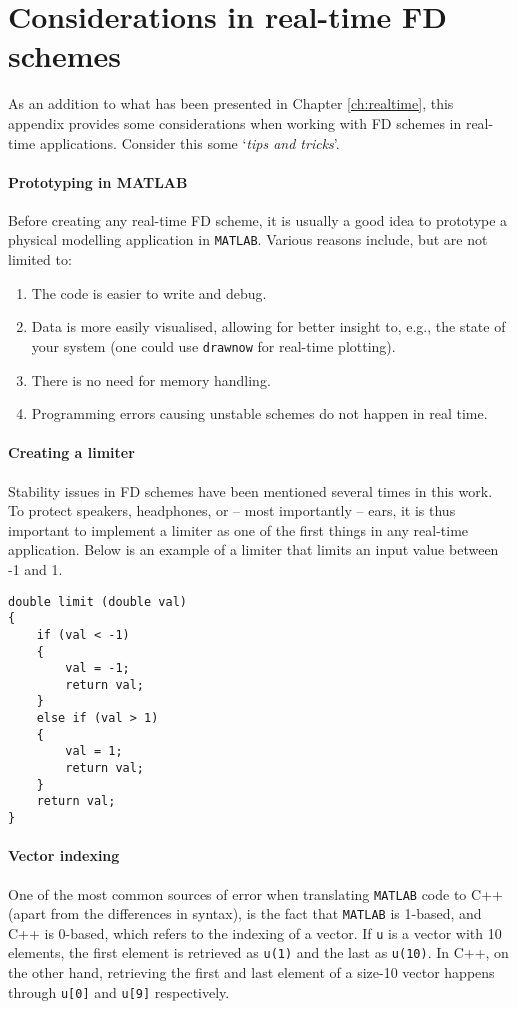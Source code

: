 \chapter{Considerations in real-time FD schemes}\label{app:realTimeConsiderations}
As an addition to what has been presented in Chapter \ref{ch:realtime}, this appendix provides some considerations when working with FD schemes in real-time applications. Consider this some `\textit{tips and tricks}'. 

\subsubsection{Prototyping in MATLAB}
Before creating any real-time FD scheme, it is usually a good idea to prototype a physical modelling application in \texttt{MATLAB}. Various reasons include, but are not limited to:
\begin{enumerate}
    \item The code is easier to write and debug.
    \item Data is more easily visualised, allowing for better insight to, e.g., the state of your system (one could use \texttt{drawnow} for real-time plotting).
    \item There is no need for memory handling.
    \item Programming errors causing unstable schemes do not happen in real time.
\end{enumerate}

\subsubsection{Creating a limiter}
Stability issues in FD schemes have been mentioned several times in this work. To protect speakers, headphones, or -- most importantly -- ears, it is thus important to implement a limiter as one of the first things in any real-time application. Below is an example of a limiter that limits an input value between -1 and 1.
\\
\noindent
\begin{minipage}{\textwidth}
\setlstCpp
\begin{lstlisting}[belowskip=-0.5\baselineskip]
double limit (double val)
{
    if (val < -1)
    {
        val = -1;
        return val;
    }
    else if (val > 1)
    {
        val = 1;
        return val;
    }
    return val;
}
\end{lstlisting}
\end{minipage}  
\subsubsection{Vector indexing}
One of the most common sources of error when translating \texttt{MATLAB} code to C++ (apart from the differences in syntax), is the fact that \texttt{MATLAB} is 1-based, and C++ is 0-based, which refers to the indexing of a vector. If \texttt{u} is a vector with 10 elements, the first element is retrieved as \texttt{u(1)} and the last as \texttt{u(10)}. In C++, on the other hand, retrieving the first and last element of a size-10 vector happens through \texttt{u[0]} and \texttt{u[9]} respectively. 

